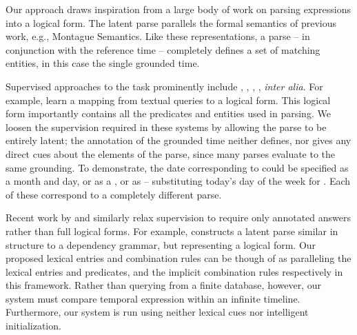 Our approach draws inspiration from a large body of work
	on parsing expressions into a logical form.
The latent parse parallels the formal semantics of previous work,
	e.g., Montague Semantics.
Like these representations, a parse -- in conjunction with
	the reference time -- completely defines a set of
	matching entities, in this case the single grounded time.

Supervised approaches to the task prominently include
	,
	,
	, 
	, 
	\textit{inter alia}.
For example,  learn a mapping from
	textual queries to a logical form.
This logical form importantly contains all the predicates and entities
	used in parsing.
We loosen the supervision required in these systems by allowing the parse to
	be entirely latent;
	the annotation of the grounded time neither defines, nor gives any
	direct cues about the elements of the parse, since many parses evaluate
	to the same grounding.
To demonstrate, the date corresponding to  could be
	specified as a month and day, or as a , or as  -- substituting today's day of the week for .
Each of these correspond to a completely different parse.

Recent work by  and 
	 similarly relax supervision 
	to require only annotated answers rather than full logical forms.
For example,  constructs a latent parse
	similar in structure to a dependency grammar, but representing a logical
	form.
Our proposed lexical entries and combination rules can be though of as
	paralleling the lexical entries and predicates, and the implicit combination 
	rules respectively in this framework.
Rather than querying from a finite database, however, our system must compare
	temporal expression within an infinite timeline.
Furthermore, our system is run using neither lexical cues nor intelligent
	initialization.

